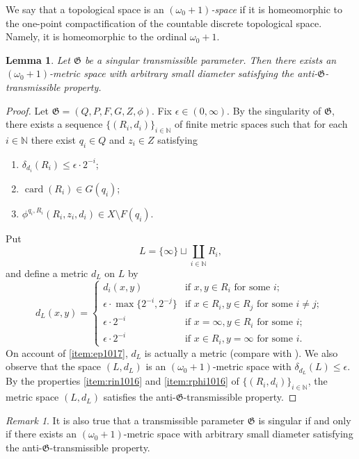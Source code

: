 \documentclass[a4paper, 12pt]{amsart}
\theoremstyle{plain}
\newtheorem{lem}[thm]{Lemma}
\theoremstyle{definition}
\theoremstyle{remark}
\newtheorem{rmk}{Remark}[section]
\newcommand{\nn}{\mathbb{N}}
\DeclareMathOperator{\card}{card}
\begin{document}
We say that a topological space is an
 \emph{$(\omega_{0}+1)$-space}
if it is homeomorphic to the one-point compactification of the countable 
discrete topological  space. 
Namely, it is  homeomorphic to the 
ordinal 
$\omega_{0}+1$. 
\begin{lem}\label{lem:sing}
Let 
$\mathfrak{G}$
 be a singular transmissible parameter. 
Then there exists an 
$(\omega_{0}+1)$-metric space 
with arbitrary small diameter 
satisfying the 
 anti-$\mathfrak{G}$-transmissible property. 
\end{lem}
\begin{proof}
Let 
$\mathfrak{G}=(Q, P, F, G, Z, \phi)$. 
Fix 
$\epsilon\in (0, \infty)$. 
By the singularity of 
$\mathfrak{G}$, 
there exists a sequence 
$\{(R_{i}, d_{i})\}_{i\in \nn}$ 
of finite metric spaces  such that for each 
$i\in \nn$ 
there exist
$q_{i}\in Q$ 
and 
$z_{i}\in Z$ 
satisfying
\begin{enumerate}[label=\textup{(R\arabic*)}]
	
	\item\label{item:ep1017}
	 $\delta_{d_{i}}(R_{i})\le \epsilon\cdot2^{-i}$; 
	
	\item\label{item:rin1016}
	 $\card(R_{i})\in G(q_{i})$; 
	 
	\item\label{item:rphi1016}
	$\phi^{q_{i}, R_{i}}(R_{i}, z_{i}, d_{i})\in X\setminus F(q_{i})$. 
\end{enumerate}
Put
	\[
	L=\{\infty\}\sqcup \coprod_{i\in \nn}R_{i}, 
	\]
and define a metric 
$d_{L}$ 
on 
$L$ 
by 
\[
d_{L}(x, y)=
\begin{cases}
		d_{i}(x,y) & \text{if $x,y\in R_{i}$ for some $i$;}\\
		\epsilon\cdot \max\{2^{-i}, 2^{-j}\} & \text{if $x\in R_{i}, y\in R_{j}$ for some $i\neq j$; }\\
		\epsilon\cdot2^{-i} & \text{if $x=\infty, y\in R_{i}$ for some $i$;}\\
		\epsilon\cdot2^{-i} & \text{if $x\in R_{i}, y=\infty$ for some $i$.}
	\end{cases}
\]
On account of 
\ref{item:ep1017}, 
$d_{L}$ is actually a metric  (compare with \cite[Definition 3.3]{Ishiki2019}). 
We also observe that the space 
$(L, d_{L})$ 
is an 
$(\omega_0+1)$-metric space with
 $\delta_{d_{L}}(L)\le \epsilon$. 
By the properties 
\ref{item:rin1016} 
and 
\ref{item:rphi1016}
 of 
$\{(R_{i}, d_{i})\}_{i\in \nn}$, 
the metric space 
$(L, d_{L})$ 
satisfies the 
anti-$\mathfrak{G}$-transmissible property. 
\end{proof}
\begin{rmk}
It is also true that 
a transmissible parameter 
$\mathfrak{G}$ 
is singular if and only if 
there exists an 
$(\omega_0+1)$-metric space 
with arbitrary small diameter 
satisfying  the 
anti-$\mathfrak{G}$-transmissible property. 
\end{rmk}
\end{document}
